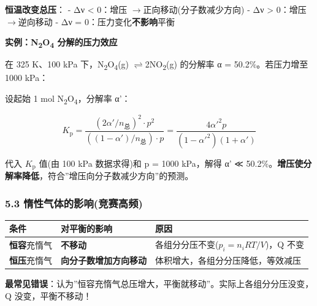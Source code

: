 \documentclass[a4paper,11pt]{ctexart}
\newcounter{none}
\newcommand{\箭}{\ensuremath{\rightarrow}}
\newcommand{\左箭}{\ensuremath{\leftarrow}}
\newcommand{\上箭}{\ensuremath{\uparrow}}
\newcommand{\下箭}{\ensuremath{\downarrow}}
\newcommand{\衡}{\ensuremath{\rightleftharpoons}}
\newcommand{\双箭}{\ensuremath{\leftrightarrow}}
\newcommand{\约等于}{\ensuremath{\approx}}
\newcommand{\小于等于}{\ensuremath{\leq}}
\newcommand{\大于等于}{\ensuremath{\geq}}
\newcommand{\不等于}{\ensuremath{\neq}}
\newcommand{\西格马}{\ensuremath{\sigma}}
\newcommand{\派}{\ensuremath{\pi}}
\begin{document}
\textbf{恒温改变总压}：
- Δν \textless{} 0：增压 \箭 正向移动(分子数减少方向)
- Δν \textgreater{} 0：增压 \箭 逆向移动
- Δν = 0：压力变化\textbf{不影响}平衡

\textbf{实例：N\textsubscript{2}O\textsubscript{4} 分解的压力效应}

在 325 K、100 kPa 下，N\textsubscript{2}O\textsubscript{4}(g) \衡 2NO\textsubscript{2}(g) 的分解率 α = 50.2\%。若压力增至 1000 kPa：

设起始 1 mol N\textsubscript{2}O\textsubscript{4}，分解率 α'：

\[
K_{\mathrm p} = \frac{(2\alpha'/n_{总})^2 \cdot p^2}{((1-\alpha')/n_{总}) \cdot p} = \frac{4\alpha'^2 p}{(1-\alpha'^2)(1+\alpha')}
\]

代入 \(K_{\mathrm p}\) 值(由 100 kPa 数据求得)和 p = 1000 kPa，解得 α' ≪ 50.2\%。\textbf{增压使分解率降低}，符合''增压向分子数减少方向''的预测。

\subsubsection{5.3 惰性气体的影响(竞赛高频)}\label{ux60f0ux6027ux6c14ux4f53ux7684ux5f71ux54cdux7adeux8d5bux9ad8ux9891}

{\def\LTcaptype{none} %
\begin{longtable}[]{@{}
  >{\raggedright\arraybackslash}p{}
  >{\raggedright\arraybackslash}p{}
  >{\raggedright\arraybackslash}p{}@{}}
\toprule\noalign{}
\begin{minipage}[b]{\linewidth}\raggedright
条件
\end{minipage} & \begin{minipage}[b]{\linewidth}\raggedright
对平衡的影响
\end{minipage} & \begin{minipage}[b]{\linewidth}\raggedright
原因
\end{minipage} \\
\midrule\noalign{}
\endhead
\bottomrule\noalign{}
\endlastfoot
\textbf{恒容}充惰气 & \textbf{不移动} & 各组分分压不变(\(p_i = n_iRT/V\))，Q 不变 \\
\textbf{恒压}充惰气 & \textbf{向分子数增加方向移动} & 体积增大，各组分分压降低，等效减压 \\
\end{longtable}
}

\textbf{最常见错误}：认为''恒容充惰气总压增大，平衡就移动''。实际上各组分分压没变，Q 没变，平衡不移动！
\end{document}
